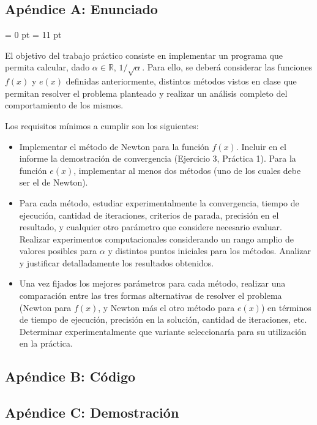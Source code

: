 \subsection{Apéndice A: Enunciado}

\parindent = 0 pt
\parskip = 11 pt

El objetivo del trabajo pr\'actico consiste en implementar un programa que permita calcular, dado $\alpha \in
\mathbb{R}$, $1/\sqrt{\alpha}$. Para ello, se deber\'a considerar las funciones $f(x)$ y $e(x)$ definidas
anteriormente, distintos m\'etodos vistos en clase que permitan resolver el problema planteado y realizar un an\'alisis
completo del comportamiento de los mismos. 

Los requisitos m\'inimos a cumplir son los siguientes:

\begin{itemize}
\item Implementar el m\'etodo de Newton para la funci\'on $f(x)$. Incluir en el informe la demostraci\'on de
convergencia (Ejercicio 3, Pr\'actica 1). Para la funci\'on $e(x)$, implementar al menos dos m\'etodos (uno de los
cuales debe ser el de Newton).   
\item Para cada m\'etodo, estudiar experimentalmente la convergencia, tiempo de ejecuci\'on, cantidad de iteraciones,
criterios de parada, precisi\'on en el resultado, y cualquier otro par\'ametro que considere necesario evaluar. Realizar experimentos
computacionales considerando un rango amplio de valores posibles para $\alpha$ y distintos puntos iniciales
para los m\'etodos. Analizar y justificar detalladamente los resultados obtenidos.
\item Una vez fijados los mejores par\'ametros para cada m\'etodo, realizar una comparaci\'on entre las tres formas
alternativas de resolver el problema (Newton para $f(x)$, y Newton m\'as el otro m\'etodo para $e(x)$) en t\'erminos de
tiempo de ejecuci\'on, precisi\'on en la soluci\'on, cantidad de iteraciones, etc. Determinar experimentalmente que
variante seleccionar\'ia para su utilizaci\'on en la pr\'actica.
\end{itemize}

\subsection{Apéndice B: Código}

\subsection{Apéndice C: Demostración}

